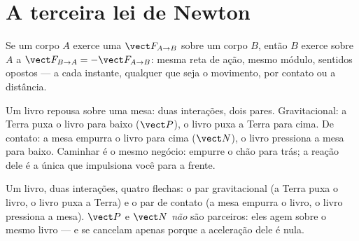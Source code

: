 \section{A terceira lei de Newton}

\begin{theorem}\label{thm:g12:newtons-laws:third}
Se um corpo $A$ exerce uma  $\vect F_{A \to B}$ sobre um corpo $B$, então $B$
exerce sobre $A$ a  $\vect F_{B \to A} = -\vect F_{A \to B}$: mesma reta de ação,
mesmo módulo, sentidos opostos --- a cada instante, qualquer que seja o movimento,
por contato ou a distância.
\end{theorem}
\admitted

\begin{example}\label{ex:g12:newtons-laws:book}
Um livro repousa sobre uma mesa: duas interações, dois pares. Gravitacional: a Terra
puxa o livro para baixo ($\vect P$), o livro puxa a Terra para cima. De contato: a
mesa empurra o livro para cima ($\vect N$), o livro pressiona a mesa para baixo.
Caminhar é o mesmo negócio: empurre o chão para trás; a reação dele é a única 
que impulsiona você para a frente.
\end{example}

\begin{omfigure}

{\small Um livro, duas interações, quatro flechas: o par gravitacional (a Terra puxa o
livro, o livro puxa a Terra) e o par de contato (a mesa empurra o livro, o livro
pressiona a mesa). $\vect P$ e $\vect N$ \emph{não} são parceiros: eles agem sobre o
mesmo livro --- e se cancelam apenas porque a aceleração dele é nula.}
\end{omfigure}

